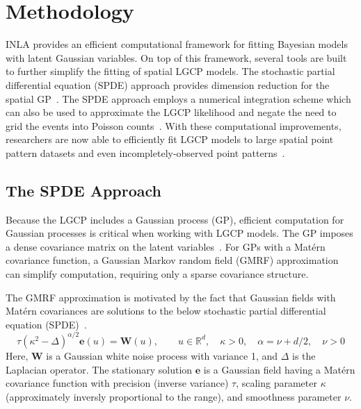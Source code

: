 \documentclass[]{interact}
\begin{document}
\section{Methodology}
\label{methods}

INLA provides an efficient computational framework for fitting Bayesian models
with latent Gaussian variables. On top of this framework, several tools are
built to further simplify the fitting of spatial LGCP models. The stochastic
partial differential equation (SPDE) approach provides dimension reduction for
the spatial GP~\cite{lindgrenetal}. The SPDE approach employs a numerical
integration scheme which can also be used to approximate the LGCP likelihood
and negate the need to grid the events into Poisson counts~\cite{simpsonetal}.
With these computational improvements, researchers are now able to efficiently
fit LGCP models to large spatial point pattern datasets and even
incompletely-observed point patterns~\cite{yuanetal}.  


\subsection{The SPDE Approach}
\label{spde}

Because the LGCP includes a Gaussian process (GP), efficient computation for
Gaussian processes is critical when working with LGCP models. The GP imposes a
dense covariance matrix on the latent variables~\cite{rinla}. For GPs with a
Mat\'{e}rn covariance function, a Gaussian Markov random field (GMRF)
approximation can simplify computation, requiring only a sparse covariance
structure.

The GMRF approximation is motivated by the fact that Gaussian fields with
Mat\'{e}rn covariances are solutions to the below stochastic partial
differential equation (SPDE)~\cite{lindgrenetal}.
\begin{displaymath}
\tau(\kappa^{2} - \Delta)^{\alpha / 2} \mathbf{e}(u) = \mathbf{W}(u),
\qquad u \in \mathbb{R}^d, \quad \kappa > 0,
\quad \alpha = \nu + d/2, \quad \nu > 0
\end{displaymath}
Here, \(\mathbf{W}\) is a Gaussian white noise process with variance 1, and
\(\Delta\) is the Laplacian operator. The stationary solution
\(\mathbf{e}\) is a Gaussian field having a Mat\'{e}rn covariance
function with precision (inverse variance) \(\tau\),  scaling parameter
\(\kappa\) (approximately inversly proportional to the range), and smoothness
parameter \(\nu\).
\end{document}
